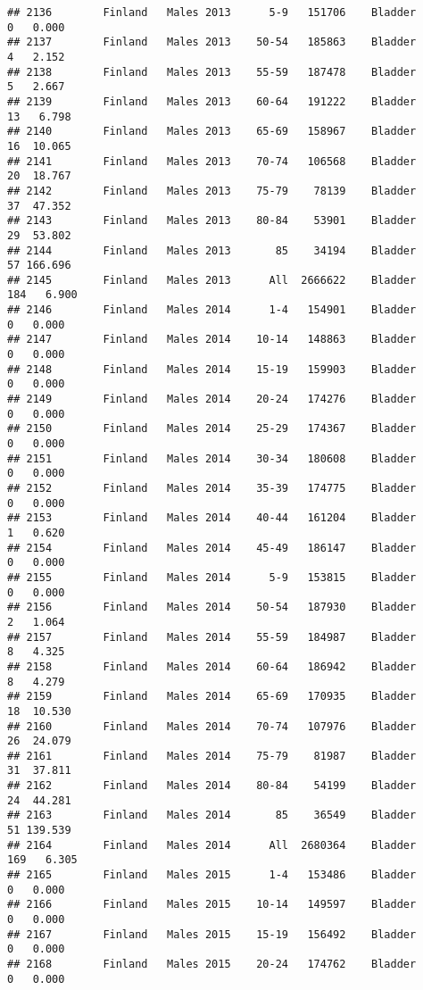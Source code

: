 \documentclass[
]{article}
\begin{document}
\begin{verbatim}
## 2136        Finland   Males 2013      5-9   151706    Bladder      0   0.000
## 2137        Finland   Males 2013    50-54   185863    Bladder      4   2.152
## 2138        Finland   Males 2013    55-59   187478    Bladder      5   2.667
## 2139        Finland   Males 2013    60-64   191222    Bladder     13   6.798
## 2140        Finland   Males 2013    65-69   158967    Bladder     16  10.065
## 2141        Finland   Males 2013    70-74   106568    Bladder     20  18.767
## 2142        Finland   Males 2013    75-79    78139    Bladder     37  47.352
## 2143        Finland   Males 2013    80-84    53901    Bladder     29  53.802
## 2144        Finland   Males 2013       85    34194    Bladder     57 166.696
## 2145        Finland   Males 2013      All  2666622    Bladder    184   6.900
## 2146        Finland   Males 2014      1-4   154901    Bladder      0   0.000
## 2147        Finland   Males 2014    10-14   148863    Bladder      0   0.000
## 2148        Finland   Males 2014    15-19   159903    Bladder      0   0.000
## 2149        Finland   Males 2014    20-24   174276    Bladder      0   0.000
## 2150        Finland   Males 2014    25-29   174367    Bladder      0   0.000
## 2151        Finland   Males 2014    30-34   180608    Bladder      0   0.000
## 2152        Finland   Males 2014    35-39   174775    Bladder      0   0.000
## 2153        Finland   Males 2014    40-44   161204    Bladder      1   0.620
## 2154        Finland   Males 2014    45-49   186147    Bladder      0   0.000
## 2155        Finland   Males 2014      5-9   153815    Bladder      0   0.000
## 2156        Finland   Males 2014    50-54   187930    Bladder      2   1.064
## 2157        Finland   Males 2014    55-59   184987    Bladder      8   4.325
## 2158        Finland   Males 2014    60-64   186942    Bladder      8   4.279
## 2159        Finland   Males 2014    65-69   170935    Bladder     18  10.530
## 2160        Finland   Males 2014    70-74   107976    Bladder     26  24.079
## 2161        Finland   Males 2014    75-79    81987    Bladder     31  37.811
## 2162        Finland   Males 2014    80-84    54199    Bladder     24  44.281
## 2163        Finland   Males 2014       85    36549    Bladder     51 139.539
## 2164        Finland   Males 2014      All  2680364    Bladder    169   6.305
## 2165        Finland   Males 2015      1-4   153486    Bladder      0   0.000
## 2166        Finland   Males 2015    10-14   149597    Bladder      0   0.000
## 2167        Finland   Males 2015    15-19   156492    Bladder      0   0.000
## 2168        Finland   Males 2015    20-24   174762    Bladder      0   0.000

\end{verbatim}
\end{document}
